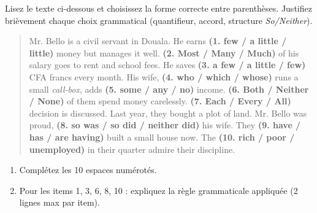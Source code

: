 \documentclass[11pt]{article}
\begin{document}
\begin{exercice}
Lisez le texte ci-dessous et choisissez la forme correcte entre parenthèses. Justifiez brièvement chaque choix grammatical (quantifieur, accord, structure \textit{So/Neither}).
\begin{quote}
Mr. Bello is a civil servant in Douala. He earns \textbf{(1. few / a little / little)} money but manages it well. \textbf{(2. Most / Many / Much)} of his salary goes to rent and school fees. He saves \textbf{(3. a few / a little / few)} CFA francs every month. His wife, \textbf{(4. who / which / whose)} runs a small \textit{call-box}, adds \textbf{(5. some / any / no)} income. \textbf{(6. Both / Neither / None)} of them spend money carelessly. \textbf{(7. Each / Every / All)} decision is discussed. Last year, they bought a plot of land. Mr. Bello was proud, \textbf{(8. so was / so did / neither did)} his wife. They \textbf{(9. have / has / are having)} built a small house now. The \textbf{(10. rich / poor / unemployed)} in their quarter admire their discipline.
\end{quote}
\begin{enumerate}
    \item Complétez les 10 espaces numérotés.
    \item Pour les items 1, 3, 6, 8, 10 : expliquez la règle grammaticale appliquée (2 lignes max par item).
\end{enumerate}
\end{exercice}
\end{document}

